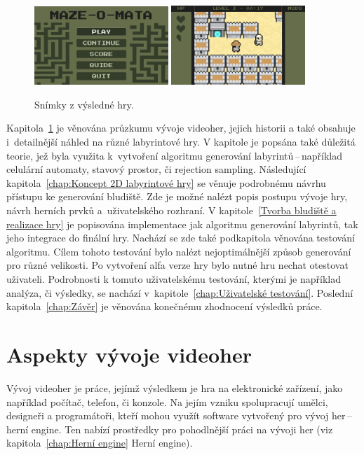 \begin{figure}[b]
    \centering
    \includegraphics[width=0.45\textwidth]{obrazky-figures/ch1/game_menu.png}\hspace{0.5cm}
    \includegraphics[width=0.45\textwidth]{obrazky-figures/ch1/game_screen.png}
    \caption{Snímky z výsledné hry.}
    \label{fig:final_game}
\end{figure}

Kapitola~\ref{chap:Aspekty vývoje videoher} je věnována průzkumu vývoje videoher, jejich historii a také obsahuje i~detailnější náhled na různé labyrintové hry. V kapitole je popsána také důležitá teorie, jež byla využita k~vytvoření algoritmu generování labyrintů\,--\,například celulární automaty, stavový prostor, či rejection sampling. Následující kapitola~\ref{chap:Koncept 2D labyrintové hry} se věnuje podrobnému návrhu přístupu ke generování bludiště. Zde je možné nalézt popis postupu vývoje hry, návrh herních prvků a~uživatelského rozhraní. V kapitole~\ref{Tvorba bludiště a realizace hry} je popisována implementace jak algoritmu generování labyrintů, tak jeho integrace do finální hry. Nachází se zde také podkapitola věnována testování algoritmu. Cílem tohoto testování bylo nalézt nejoptimálnější způsob generování pro různé velikosti. Po vytvoření alfa verze hry bylo nutné hru nechat otestovat uživateli. Podrobnosti k tomuto uživatelskému testování, kterými je například analýza, či výsledky, se nachází v~kapitole~\ref{chap:Uživatelské testování}. Poslední kapitola~\ref{chap:Závěr} je věnována konečnému zhodnocení výsledků práce.

\chapter{Aspekty vývoje videoher}\label{chap:Aspekty vývoje videoher}
Vývoj videoher je práce, jejímž výsledkem je hra na elektronické zařízení, jako například počítač, telefon, či konzole. Na jejím vzniku spolupracují umělci, designeři a programátoři, kteří mohou využít software vytvořený pro vývoj her\,--\,herní engine. Ten nabízí prostředky pro pohodlnější práci na vývoji her (viz kapitola~\ref{chap:Herní engine} Herní engine).

